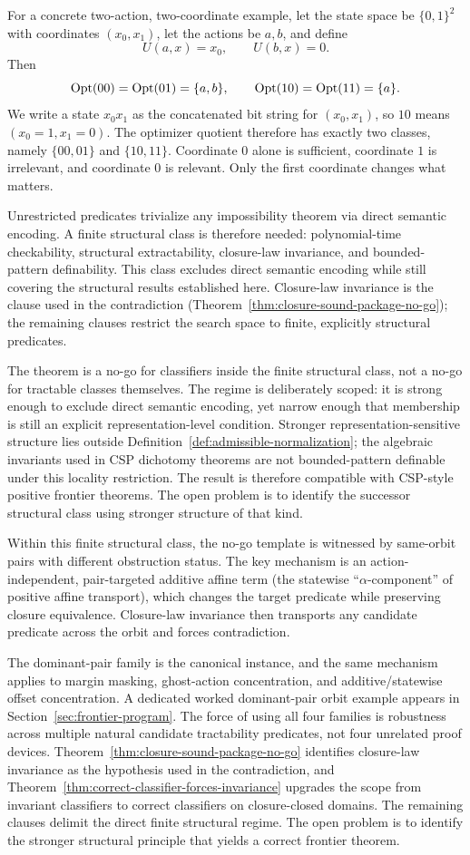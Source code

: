 For a concrete two-action, two-coordinate example, let the state space be $\{0,1\}^2$ with coordinates $(x_0,x_1)$, let the actions be $a,b$, and define
\[
U(a,x)=x_0,
\qquad
U(b,x)=0.
\]
Then
\[
\operatorname{Opt}(00)=\operatorname{Opt}(01)=\{a,b\},
\qquad
\operatorname{Opt}(10)=\operatorname{Opt}(11)=\{a\}.
\]
We write a state $x_0x_1$ as the concatenated bit string for $(x_0,x_1)$, so $10$ means $(x_0=1,x_1=0)$.
The optimizer quotient therefore has exactly two classes, namely $\{00,01\}$ and $\{10,11\}$. Coordinate $0$ alone is sufficient, coordinate $1$ is irrelevant, and coordinate $0$ is relevant. Only the first coordinate changes what matters.

Unrestricted predicates trivialize any impossibility theorem via direct semantic encoding. A finite structural class is therefore needed: polynomial-time checkability, structural extractability, closure-law invariance, and bounded-pattern definability. This class excludes direct semantic encoding while still covering the structural results established here. Closure-law invariance is the clause used in the contradiction (Theorem~\ref{thm:closure-sound-package-no-go}); the remaining clauses restrict the search space to finite, explicitly structural predicates.

The theorem is a no-go for classifiers inside the finite structural class, not a no-go for tractable classes themselves. The regime is deliberately scoped: it is strong enough to exclude direct semantic encoding, yet narrow enough that membership is still an explicit representation-level condition. Stronger representation-sensitive structure lies outside Definition~\ref{def:admissible-normalization}; the algebraic invariants used in CSP dichotomy theorems are not bounded-pattern definable under this locality restriction. The result is therefore compatible with CSP-style positive frontier theorems. The open problem is to identify the successor structural class using stronger structure of that kind.

Within this finite structural class, the no-go template is witnessed by same-orbit pairs with different obstruction status. The key mechanism is an action-independent, pair-targeted additive affine term (the statewise ``$\alpha$-component'' of positive affine transport), which changes the target predicate while preserving closure equivalence. Closure-law invariance then transports any candidate predicate across the orbit and forces contradiction.

The dominant-pair family is the canonical instance, and the same mechanism applies to margin masking, ghost-action concentration, and additive/statewise offset concentration. A dedicated worked dominant-pair orbit example appears in Section~\ref{sec:frontier-program}. The force of using all four families is robustness across multiple natural candidate tractability predicates, not four unrelated proof devices. Theorem~\ref{thm:closure-sound-package-no-go} identifies closure-law invariance as the hypothesis used in the contradiction, and Theorem~\ref{thm:correct-classifier-forces-invariance} upgrades the scope from invariant classifiers to correct classifiers on closure-closed domains. The remaining clauses delimit the direct finite structural regime. The open problem is to identify the stronger structural principle that yields a correct frontier theorem.

